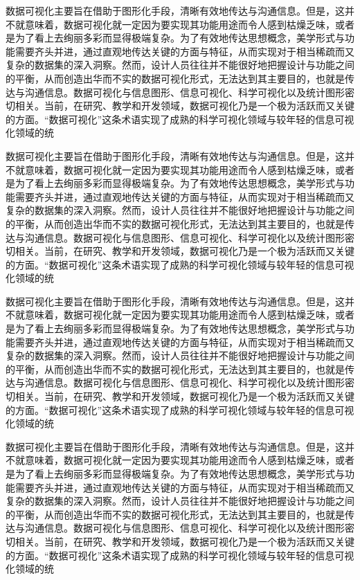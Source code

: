 	数据可视化主要旨在借助于图形化手段，清晰有效地传达与沟通信息。但是，这并不就意味着，数据可视化就一定因为要实现其功能用途而令人感到枯燥乏味，或者是为了看上去绚丽多彩而显得极端复杂。为了有效地传达思想概念，美学形式与功能需要齐头并进，通过直观地传达关键的方面与特征，从而实现对于相当稀疏而又复杂的数据集的深入洞察。然而，设计人员往往并不能很好地把握设计与功能之间的平衡，从而创造出华而不实的数据可视化形式，无法达到其主要目的，也就是传达与沟通信息。数据可视化与信息图形、信息可视化、科学可视化以及统计图形密切相关。当前，在研究、教学和开发领域，数据可视化乃是一个极为活跃而又关键的方面。“数据可视化”这条术语实现了成熟的科学可视化领域与较年轻的信息可视化领域的统
	
	数据可视化主要旨在借助于图形化手段，清晰有效地传达与沟通信息。但是，这并不就意味着，数据可视化就一定因为要实现其功能用途而令人感到枯燥乏味，或者是为了看上去绚丽多彩而显得极端复杂。为了有效地传达思想概念，美学形式与功能需要齐头并进，通过直观地传达关键的方面与特征，从而实现对于相当稀疏而又复杂的数据集的深入洞察。然而，设计人员往往并不能很好地把握设计与功能之间的平衡，从而创造出华而不实的数据可视化形式，无法达到其主要目的，也就是传达与沟通信息。数据可视化与信息图形、信息可视化、科学可视化以及统计图形密切相关。当前，在研究、教学和开发领域，数据可视化乃是一个极为活跃而又关键的方面。“数据可视化”这条术语实现了成熟的科学可视化领域与较年轻的信息可视化领域的统
	
	数据可视化主要旨在借助于图形化手段，清晰有效地传达与沟通信息。但是，这并不就意味着，数据可视化就一定因为要实现其功能用途而令人感到枯燥乏味，或者是为了看上去绚丽多彩而显得极端复杂。为了有效地传达思想概念，美学形式与功能需要齐头并进，通过直观地传达关键的方面与特征，从而实现对于相当稀疏而又复杂的数据集的深入洞察。然而，设计人员往往并不能很好地把握设计与功能之间的平衡，从而创造出华而不实的数据可视化形式，无法达到其主要目的，也就是传达与沟通信息。数据可视化与信息图形、信息可视化、科学可视化以及统计图形密切相关。当前，在研究、教学和开发领域，数据可视化乃是一个极为活跃而又关键的方面。“数据可视化”这条术语实现了成熟的科学可视化领域与较年轻的信息可视化领域的统
	
	数据可视化主要旨在借助于图形化手段，清晰有效地传达与沟通信息。但是，这并不就意味着，数据可视化就一定因为要实现其功能用途而令人感到枯燥乏味，或者是为了看上去绚丽多彩而显得极端复杂。为了有效地传达思想概念，美学形式与功能需要齐头并进，通过直观地传达关键的方面与特征，从而实现对于相当稀疏而又复杂的数据集的深入洞察。然而，设计人员往往并不能很好地把握设计与功能之间的平衡，从而创造出华而不实的数据可视化形式，无法达到其主要目的，也就是传达与沟通信息。数据可视化与信息图形、信息可视化、科学可视化以及统计图形密切相关。当前，在研究、教学和开发领域，数据可视化乃是一个极为活跃而又关键的方面。“数据可视化”这条术语实现了成熟的科学可视化领域与较年轻的信息可视化领域的统
	
